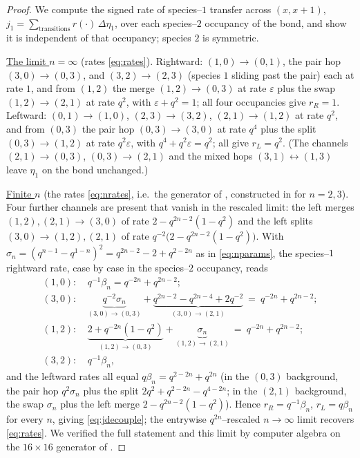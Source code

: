 \documentclass[11pt]{article}
\theoremstyle{plain}
\theoremstyle{definition}
\theoremstyle{remark}
\newcommand{\eps}{\varepsilon}\newcommand{\Exp}{\mathrm{Exp}}
\begin{document}
\begin{proof}
We compute the signed rate of species--$1$ transfer across $(x,x{+}1)$,
$j_1=\sum_{\text{transitions}}r(\cdot)\,\Delta\eta_1$, over each species--$2$ occupancy
of the bond, and show it is independent of that occupancy; species $2$ is symmetric.

\underline{The limit $n=\infty$} \textup{(}rates \eqref{eq:rates}\textup{)}. Rightward:
$(1,0)\!\to\!(0,1)$, the pair hop $(3,0)\!\to\!(0,3)$, and $(3,2)\!\to\!(2,3)$ (species
$1$ sliding past the pair) each at rate $1$, and from $(1,2)$ the merge
$(1,2)\!\to\!(0,3)$ at rate $\eps$ plus the swap $(1,2)\!\to\!(2,1)$ at rate $q^2$, with
$\eps+q^2=1$; all four occupancies give $r_R=1$. Leftward: $(0,1)\!\to\!(1,0)$,
$(2,3)\!\to\!(3,2)$, $(2,1)\!\to\!(1,2)$ at rate $q^2$, and from $(0,3)$ the pair hop
$(0,3)\!\to\!(3,0)$ at rate $q^4$ plus the split $(0,3)\!\to\!(1,2)$ at rate $q^2\eps$,
with $q^4+q^2\eps=q^2$; all give $r_L=q^2$. (The channels $(2,1)\!\to\!(0,3)$,
$(0,3)\!\to\!(2,1)$ and the mixed hops $(3,1)\!\leftrightarrow\!(1,3)$ leave $\eta_1$ on
the bond unchanged.)

\underline{Finite $n$} \textup{(}the rates \eqref{eq:nrates}, i.e.\ the generator of
\cite[\S2.1]{REU}, constructed in
\cite{KLLPZ} for $n=2,3$\textup{)}. Four further channels are present that vanish in the
rescaled limit: the left merges $(1,2),(2,1)\to(3,0)$ of rate $2-q^{2n-2}(1-q^2)$ and
the left splits $(3,0)\to(1,2),(2,1)$ of rate $q^{-2}\big(2-q^{2n-2}(1-q^2)\big)$. With
$\sigma_n=(q^{n-1}-q^{1-n})^2=q^{2n-2}-2+q^{2-2n}$ as in \eqref{eq:nparams}, the
species--$1$ rightward rate,
case by case in the species--$2$ occupancy, reads
\begin{align*}
  (1,0)\colon&\ q^{-1}\beta_n=q^{-2n}+q^{2n-2};\\
  (3,0)\colon&\ \underbrace{q^{-2}\sigma_n}_{(3,0)\to(0,3)}
    +\underbrace{q^{2n-2}-q^{2n-4}+2q^{-2}}_{(3,0)\to(2,1)}\ =\ q^{-2n}+q^{2n-2};\\
  (1,2)\colon&\ \underbrace{2+q^{-2n}(1-q^2)}_{(1,2)\to(0,3)}
    +\underbrace{\sigma_n}_{(1,2)\to(2,1)}\ =\ q^{-2n}+q^{2n-2};\\
  (3,2)\colon&\ q^{-1}\beta_n,
\end{align*}
and the leftward rates all equal $q\beta_n=q^{2-2n}+q^{2n}$ (in the $(0,3)$ background,
the pair hop $q^2\sigma_n$ plus the split $2q^2+q^{2-2n}-q^{4-2n}$; in the $(2,1)$
background, the swap $\sigma_n$ plus the left merge $2-q^{2n-2}(1-q^2)$). Hence
$r_R=q^{-1}\beta_n$, $r_L=q\beta_n$ for every $n$, giving \eqref{eq:jdecouple}; the
entrywise $q^{2n}$--rescaled $n\to\infty$ limit recovers \eqref{eq:rates}. We verified
the full statement and this limit by computer algebra on the $16\times16$ generator of
\cite[\S2.1]{REU}.


\end{proof}
\end{document}
